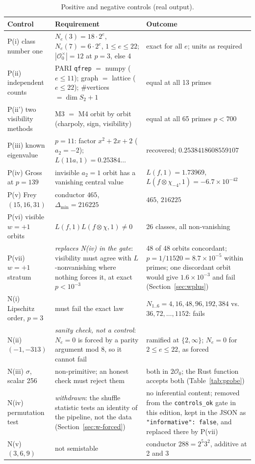\documentclass[11pt,a4paper]{article}
\theoremstyle{definition}
\newcommand{\Oz}{\mathcal{O}_0}
\begin{document}
\begin{table}[htbp]
\centering
\caption{Positive and negative controls (real output).}
\label{tab:controls}
\footnotesize
\begin{tabularx}{\textwidth}{@{}l X X@{}}
\toprule
\textbf{Control} & \textbf{Requirement} & \textbf{Outcome} \\
\midrule
P(i) class number one & $N_e(3)=18\cdot2^e$, $N_e(7)=6\cdot2^e$, $1\le e\le22$; $|\Oz^\times|=12$ at $p=3$, else 4 & exact for all $e$; units as required \\
P(ii) independent counts & PARI \texttt{qfrep} $=$ numpy ($e\le11$); graph $=$ lattice ($e\le22$); $\#$vertices $=\dim S_2+1$ & equal at all 13 primes \\
P(ii') two visibility methods & M3 $=$ M4 orbit by orbit (charpoly, sign, visibility) & equal at all 65 primes $p<700$ \\
P(iii) known eigenvalue & $p=11$: factor $x^2+2x+2$ ($a_2=-2$); $L(11a,1)=0.25384\ldots$ & recovered; $0.2538418608559107$ \\
P(iv) Gross at $p=139$ & invisible $a_2=1$ orbit has a vanishing central value & $L(f,1)=1.73969$, $L(f\otimes\chi_{-4},1)=-6.7\times10^{-42}$ \\
P(v) Frey $(15,16,31)$ & conductor $465$, $\Delta_{\min}=216225$ & $465$, $216225$ \\
P(vi) visible $w=+1$ orbits & $L(f,1)L(f\otimes\chi,1)\ne0$ & 26 classes, all non-vanishing \\
P(vii) $w=+1$ stratum & \emph{replaces N(iv) in the gate}: visibility must agree with $L$-nonvanishing where nothing forces it, at exact $p<10^{-3}$ & 48 of 48 orbits concordant; $p=1/11520=8.7\times10^{-5}$ within primes; one discordant orbit would give $1.6\times10^{-3}$ and fail (Section~\ref{sec:wplus}) \\
\midrule
N(i) Lipschitz order, $p=3$ & must fail the exact law & $N_{1..6}=4,16,48,96,192,384$ vs.\ $36,72,\dots,1152$: fails \\
N(ii) $(-1,-313)$ & \emph{sanity check, not a control}: $N_e=0$ is forced by a parity argument mod $8$, so it cannot fail & ramified at $\{2,\infty\}$; $N_e=0$ for $2\le e\le22$, as forced \\
N(iii) $\sigma$, scalar 256 & non-primitive; an honest check must reject them & both in $2\Oz$; the Rust function accepts both (Table~\ref{tab:probe}) \\
N(iv) permutation test & \emph{withdrawn}: the shuffle statistic tests an identity of the pipeline, not the data (Section~\ref{sec:w-forced}) & no inferential content; removed from the \texttt{controls\_ok} gate in this edition, kept in the JSON as \texttt{"informative": false}, and replaced there by P(vii) \\
N(v) $(3,6,9)$ & not semistable & conductor $288=2^5 3^2$, additive at 2 and 3 \\
\bottomrule
\end{tabularx}
\end{table}
\end{document}
